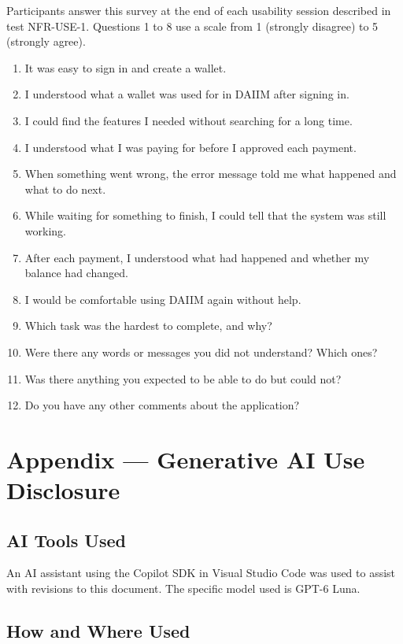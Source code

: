 \documentclass[12pt]{article}
\begin{document}
Participants answer this survey at the end of each usability session described
in test NFR-USE-1. Questions 1 to 8 use a
scale from 1 (strongly disagree) to 5 (strongly agree).

\begin{enumerate}
\item It was easy to sign in and create a wallet.
\item I understood what a wallet was used for in DAIIM after signing in.
\item I could find the features I needed without searching for a long time.
\item I understood what I was paying for before I approved each payment.
\item When something went wrong, the error message told me what happened and
what to do next.
\item While waiting for something to finish, I could tell that the system was
still working.
\item After each payment, I understood what had happened and whether my balance
had changed.
\item I would be comfortable using DAIIM again without help.
\item Which task was the hardest to complete, and why?
\item Were there any words or messages you did not understand? Which ones?
\item Was there anything you expected to be able to do but could not?
\item Do you have any other comments about the application?
\end{enumerate}

\newpage{}

\section{Appendix --- Generative AI Use Disclosure}

\subsection{AI Tools Used}

An AI assistant using the Copilot SDK in Visual Studio Code was used to assist
with revisions to this document. The specific model used is GPT-6 Luna.

\subsection{How and Where Used}
\end{document}

